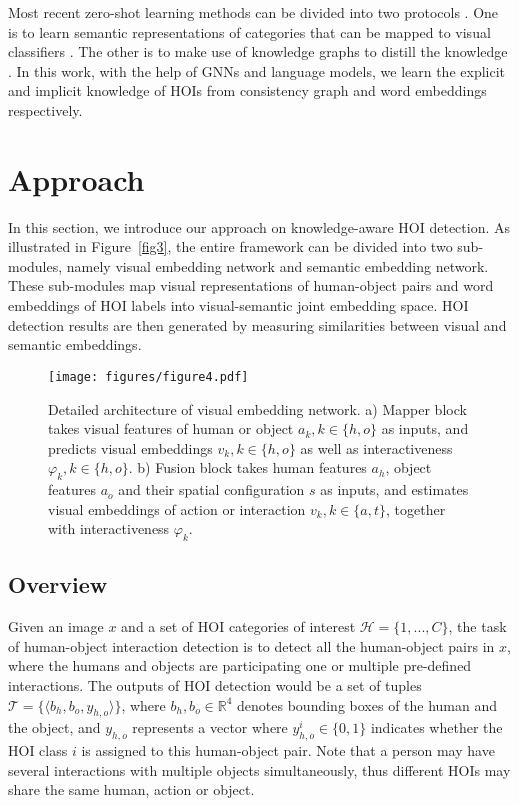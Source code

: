 \documentclass[sigconf,screen]{acmart}
\begin{document}
Most recent zero-shot learning methods can be divided into two protocols \cite{wang2019survey}. One is to learn semantic representations of categories that can be mapped to visual classifiers \cite{changpinyo2016synthesized,changpinyo2017predicting}. The other is to make use of knowledge graphs to distill the knowledge \cite{chen2013neil,deng2014large}. In this work, with the help of GNNs and language models, we learn the explicit and implicit knowledge of HOIs from consistency graph and word embeddings respectively.

\section{Approach}

In this section, we introduce our approach on knowledge-aware HOI detection. As illustrated in Figure~\ref{fig3}, the entire framework can be divided into two sub-modules, namely visual embedding network and semantic embedding network. These sub-modules map visual representations of human-object pairs and word embeddings of HOI labels into visual-semantic joint embedding space. HOI detection results are then generated by measuring similarities between visual and semantic embeddings.

\begin{figure}
\centering
\texttt{[image: figures/figure4.pdf]}
\caption{Detailed architecture of visual embedding network. a) Mapper block takes visual features of human or object $a_k, k \in \{h, o\}$ as inputs, and predicts visual embeddings $v_k, k \in \{h, o\}$ as well as interactiveness $\varphi_k, k \in \{h, o\}$. b) Fusion block takes human features $a_h$, object features $a_o$ and their spatial configuration $s$ as inputs, and estimates visual embeddings of action or interaction $v_k, k \in \{a, t\}$, together with interactiveness $\varphi_k$.}
\label{fig4}
\end{figure}

\subsection{Overview}

Given an image $x$ and a set of HOI categories of interest $\mathcal{H} = \{1,...,C\}$, the task of human-object interaction detection is to detect all the human-object pairs in $x$, where the humans and objects are participating one or multiple pre-defined interactions. The outputs of HOI detection would be a set of tuples $\mathcal{T} = \{\langle b_h, b_o, y_{h,o} \rangle\}$, where $b_h, b_o \in \mathbb{R}^4$ denotes bounding boxes of the human and the object, and $y_{h, o}$ represents a vector where $y^i_{h, o} \in \{0,1\}$ indicates whether the HOI class $i$ is assigned to this human-object pair. Note that a person may have several interactions with multiple objects simultaneously, thus different HOIs may share the same human, action or object.
\end{document}
